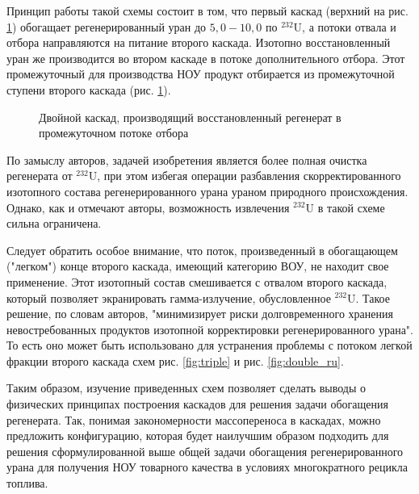 Принцип работы такой схемы состоит в том, что первый каскад (верхний на рис. \ref{fig:double_crazy}) обогащает регенерированный уран до $5,0-10,0$ по $^{232}$U, а потоки отвала и отбора направляются на питание второго каскада.
Изотопно восстановленный уран же производится во втором каскаде в потоке дополнительного отбора.
Этот промежуточный для производства НОУ продукт отбирается из промежуточной ступени второго каскада (рис. \ref{fig:double_crazy}).
\begin{figure}[ht]
  \caption{Двойной каскад, производящий восстановленный регенерат в промежуточном потоке отбора}\label{fig:double_crazy}
\end{figure}

По замыслу авторов, задачей изобретения является более полная очистка регенерата от $^{232}$U, при этом избегая операции разбавления скорректированного изотопного состава регенерированного урана ураном природного происхождения.
Однако, как и отмечают авторы, возможность извлечения $^{232}$U в такой схеме сильна ограничена.

Следует обратить особое внимание, что поток, произведенный в обогащающем ("легком") конце второго каскада, имеющий категорию ВОУ, не находит свое применение.
Этот изотопный состав смешивается с отвалом второго каскада, который позволяет экранировать гамма-излучение, обусловленное $^{232}$U.
Такое решение, по словам авторов, "минимизирует риски долговременного хранения невостребованных продуктов изотопной корректировки регенерированного урана".
То есть оно может быть использовано для устранения проблемы с потоком легкой фракции второго каскада схем рис. \ref{fig:triple} и рис. \ref{fig:double_ru}.


Таким образом, изучение приведенных схем позволяет сделать выводы о физических принципах построения каскадов для решения задачи обогащения регенерата. 
Так, понимая закономерности массопереноса в каскадах, можно предложить конфигурацию, которая будет наилучшим образом подходить для решения сформулированной выше общей задачи обогащения регенерированного урана для получения НОУ товарного качества в условиях многократного рецикла топлива.

